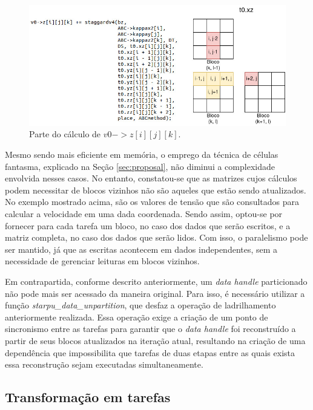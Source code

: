 \documentclass[cic,tc]{iiufrgs}
\begin{document}
\begin{figure}[!htb]
  \caption{Parte do cálculo de $v0->z[i][j][k]$.}
    \begin{center} 
      \includegraphics[width=32em]{neighborhood}
    \end{center}
    \label{fig:neighborhood}
\end{figure}

Mesmo sendo mais eficiente em memória, o emprego da técnica de células fantasma, explicado na Seção \ref{sec:proposal}, não diminui
a complexidade envolvida nesses casos. No entanto, constatou-se que as matrizes cujos cálculos podem necessitar de blocos vizinhos não são
aqueles que estão sendo atualizados. No exemplo mostrado acima, são os valores de tensão que são consultados para calcular a velocidade
em uma dada coordenada. Sendo assim, optou-se por fornecer para cada tarefa um bloco, no caso dos dados que serão escritos, e a matriz
completa, no caso dos dados que serão lidos. Com isso, o paralelismo pode ser mantido, já que as escritas acontecem em dados independentes,
sem a necessidade de gerenciar leituras em blocos vizinhos.

Em contrapartida, conforme descrito anteriormente, um \textit{data handle} particionado não pode mais ser acessado da maneira original. Para isso, é necessário
utilizar a função \textit{starpu\_data\_unpartition}, que desfaz a operação de ladrilhamento anteriormente realizada. Essa operação exige a criação de um ponto
de sincronismo entre as tarefas para garantir que o \textit{data handle} foi reconstruído a partir de seus blocos atualizados na iteração atual, resultando na
criação de uma dependência que impossibilita que tarefas de duas etapas entre as quais exista essa reconstrução sejam executadas simultaneamente.

\subsection{Transformação em tarefas}\label{sec:task}
\end{document}
